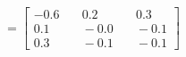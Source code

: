 \documentclass[preview]{standalone}
\begin{document}
\begin{align*}
=\begin{bmatrix} -0.6 & \quad 0.2 & \quad 0.3 \\ 0.1 & \quad -0.0 & \quad -0.1 \\ 0.3 & \quad -0.1 & \quad -0.1 \end{bmatrix}
\end{align*}
\end{document}
